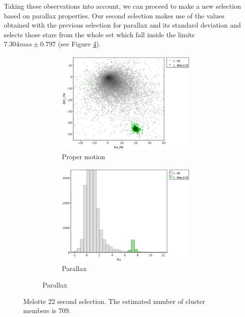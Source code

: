 \documentclass[11pt, a4paper, english]{book}
\begin{document}
Taking these observations into account,
we can proceed to make a new selection based on parallax properties.
Our second selection makes use of the values obtained with the previous selection
for parallax and its standard deviation and selects those stars from the whole set
which fall inside the limits $7.304mas \pm 0.797$ (see Figure \ref{fig:topcat_parallax_melotte_22}).

\begin{figure}[htbp]
  \centering
  \begin{subfigure}{0.9\textwidth}
    \centering
    \begin{subfigure}[t]{0.45\textwidth}
      \centering
      \includegraphics[width=\textwidth]{../figures/clusterix/topcat_2nd_selection_pm_melotte_22.png}
      \caption{Proper motion}
      \label{fig:topcat_2nd_selection_pm_melotte_22}
    \end{subfigure}
    \hfill
    \begin{subfigure}[t]{0.45\textwidth}
      \centering
      \includegraphics[width=\textwidth]{../figures/clusterix/topcat_2nd_selection_parallax_melotte_22.png}
      \caption{Parallax}
      \label{fig:topcat_2nd_selection_parallax_melotte_22}
    \end{subfigure}
  \end{subfigure}
  \caption{Melotte 22 second selection. The estimated number of cluster members is 709.}
  \label{fig:topcat_parallax_melotte_22}
\end{figure}
\end{document}
